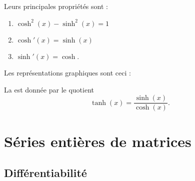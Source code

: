 Leurs principales propriétés sont :
\begin{enumerate}
    \item
        \( \cosh^2(x)-\sinh^2(x)=1\)
    \item
        \( \cosh'(x)=\sinh(x)\)
    \item
        \( \sinh'(x)=\cosh\).
\end{enumerate}

Les représentations graphiques sont ceci :
\begin{center}
   
\end{center}

La  est donnée par le quotient
\begin{equation}
    \tanh(x)=\frac{ \sinh(x) }{ \cosh(x) }.
\end{equation}

\section{Séries entières de matrices}

\subsection{Différentiabilité}

